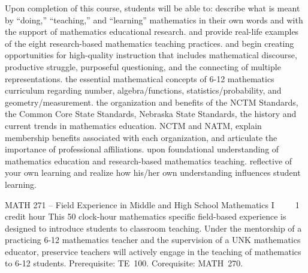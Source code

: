Upon completion of this course, students will be able to:
\itemThoroughly describe what is meant by “doing,”  “teaching,”  and “learning” mathematics in their own words and with the support of mathematics educational research.
\itemExplain and provide real-life examples of the eight research-based mathematics teaching practices.
\itemIdentify and begin creating opportunities for high-quality instruction that includes mathematical discourse, productive struggle, purposeful questioning, and the connecting of multiple representations. 
\itemArticulate the essential mathematical concepts of 6-12 mathematics curriculum regarding number, algebra/functions, statistics/probability, and geometry/measurement.
\itemExplain the organization and benefits of the NCTM Standards, the Common Core State Standards, Nebraska State Standards, 
\itemExplain the history and current trends in mathematics education.
\itemDefine NCTM and NATM, explain membership benefits associated with each organization, and articulate the importance of professional affiliations.
\itemBuild upon foundational understanding of mathematics education and research-based mathematics teaching.
\itemBe reflective of your own learning and realize how his/her own understanding influences student learning.

MATH 271 – Field Experience in Middle and High School Mathematics I     1 credit hour
This 50 clock-hour mathematics specific field-based experience is designed to introduce students to classroom teaching. Under the mentorship of a practicing 6-12 mathematics teacher and the supervision of a UNK mathematics educator, preservice teachers will actively engage in the teaching of mathematics to 6-12 students.
Prerequisite: TE 100. 
Corequisite: MATH 270.

